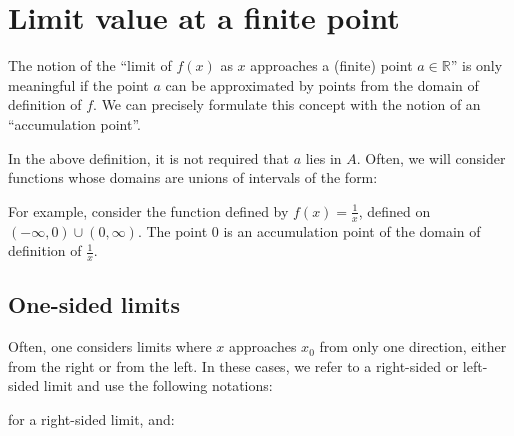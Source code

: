 \documentclass{article}
\begin{document}
\section{Limit value at a finite point}
The notion of the ``limit of $f(x)$ as $x$ approaches a (finite) point
$a \in \mathbb{R}$'' is only meaningful if the point $a$ can be
approximated by points from the domain of definition of $f$. We can
precisely formulate this concept with the notion of an ``accumulation point''.


In the above definition, it is not required that $a$ lies in $A$.
Often, we will consider functions whose domains are unions of
intervals of the form:


For example, consider the function defined by $f(x) = \frac{1}{x}$, defined
on $(-\infty, 0) \cup (0, \infty)$. The point $0$ is an accumulation point of
the domain of definition of $\frac{1}{x}$.


\subsection{One-sided limits}
Often, one considers limits where $x$ approaches $x_0$ from only one
direction, either from the right or from the left. In these cases,
we refer to a right-sided or left-sided limit and use the following
notations:


for a right-sided limit, and:

\end{document}
